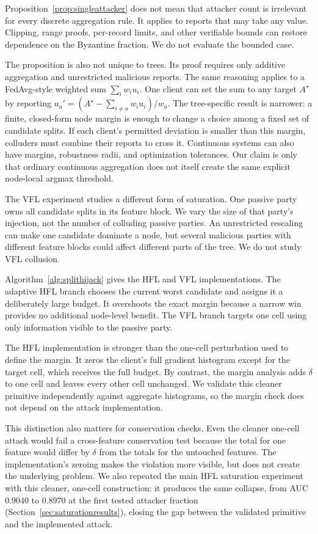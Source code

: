 \documentclass[11pt]{article}
\begin{document}
Proposition~\ref{prop:singleattacker} does not mean that attacker count is irrelevant for every discrete aggregation rule. It applies to reports that may take any value. Clipping, range proofs, per-record limits, and other verifiable bounds can restore dependence on the Byzantine fraction. We do not evaluate the bounded case.

The proposition is also not unique to trees. Its proof requires only additive aggregation and unrestricted malicious reports. The same reasoning applies to a FedAvg-style weighted sum $\sum_i w_i u_i$. One client can set the sum to any target $A^\star$ by reporting $u_a'=(A^\star-\sum_{i\neq a}w_i u_i)/w_a$. The tree-specific result is narrower: a finite, closed-form node margin is enough to change a choice among a fixed set of candidate splits. If each client's permitted deviation is smaller than this margin, colluders must combine their reports to cross it. Continuous systems can also have margins, robustness radii, and optimization tolerances. Our claim is only that ordinary continuous aggregation does not itself create the same explicit node-local argmax threshold.

The VFL experiment studies a different form of saturation. One passive party owns all candidate splits in its feature block. We vary the size of that party's injection, not the number of colluding passive parties. An unrestricted rescaling can make one candidate dominate a node, but several malicious parties with different feature blocks could affect different parts of the tree. We do not study VFL collusion.

Algorithm~\ref{alg:splithijack} gives the HFL and VFL implementations. The adaptive HFL branch chooses the current worst candidate and assigns it a deliberately large budget. It overshoots the exact margin because a narrow win provides no additional node-level benefit. The VFL branch targets one cell using only information visible to the passive party.

The HFL implementation is stronger than the one-cell perturbation used to define the margin. It zeros the client's full gradient histogram except for the target cell, which receives the full budget. By contrast, the margin analysis adds $\delta$ to one cell and leaves every other cell unchanged. We validate this cleaner primitive independently against aggregate histograms, so the margin check does not depend on the attack implementation.

This distinction also matters for conservation checks. Even the cleaner one-cell attack would fail a cross-feature conservation test because the total for one feature would differ by $\delta$ from the totals for the untouched features. The implementation's zeroing makes the violation more visible, but does not create the underlying problem. We also repeated the main HFL saturation experiment with this cleaner, one-cell construction: it produces the same collapse, from AUC $0.9040$ to $0.8970$ at the first tested attacker fraction (Section~\ref{sec:saturationresults}), closing the gap between the validated primitive and the implemented attack.
\end{document}
